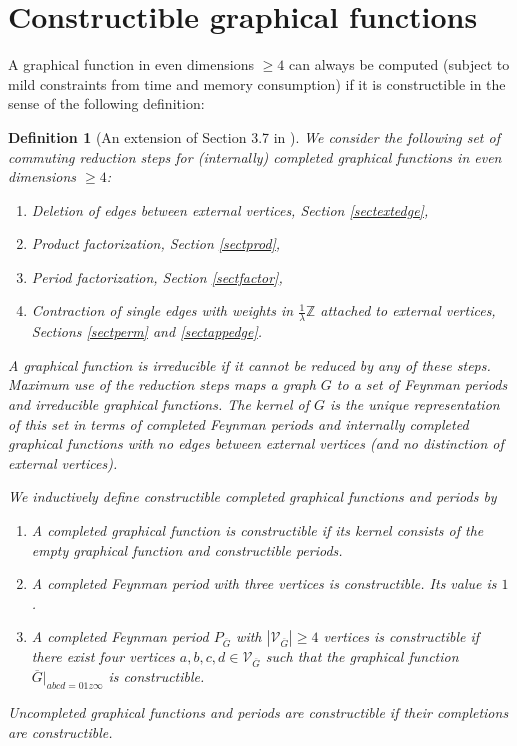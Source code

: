 \documentclass[oneside]{amsart}
\newcommand{\ZZ}{{\mathbb Z}}
\newcommand{\Gg}{{\overline{G}}}
\newcommand{\sV}{\mathcal{V}}
\theoremstyle{plain}
\newtheorem{defn}[thm]{Definition}
\begin{document}
\section{Constructible graphical functions}\label{sectconstructible}
A graphical function in even dimensions $\geq4$ can always be computed (subject to mild constraints from time and memory consumption) if it is constructible in the sense of the following definition:

\begin{defn}[An extension of Section 3.7 in \cite{gf}]\label{defconstructible}
We consider the following set of commuting reduction steps for (internally) completed graphical functions in even dimensions $\geq4$:
\begin{enumerate}
\item[(R1)] Deletion of edges between external vertices, Section \ref{sectextedge},
\item[(R2)] Product factorization, Section \ref{sectprod},
\item[(R3)] Period factorization, Section \ref{sectfactor},
\item[(R4)] Contraction of single edges with weights in $\frac{1}{\lambda}\ZZ$ attached to external vertices, Sections \ref{sectperm} and \ref{sectappedge}.
\end{enumerate}
A graphical function is {\em irreducible} if it cannot be reduced by any of these steps.
Maximum use of the reduction steps maps a graph $G$ to a set of Feynman periods and irreducible graphical functions.
The {\em kernel} of $G$ is the unique \cite{Census} representation of this set in terms of completed Feynman periods and internally completed graphical functions with no edges between
external vertices (and no distinction of external vertices).

We inductively define constructible completed graphical functions and periods by
\begin{enumerate}
\item A completed graphical function is constructible if its kernel consists of the empty graphical function and constructible periods.
\item A completed Feynman period with three vertices is constructible. Its value is $1$.
\item A completed Feynman period $P_\Gg$ with $|\sV_\Gg|\geq4$ vertices is constructible if there exist four vertices $a,b,c,d\in\sV_\Gg$
such that the graphical function $\Gg|_{abcd=01z\infty}$ is constructible.
\end{enumerate}
Uncompleted graphical functions and periods are constructible if their completions are constructible.
\end{defn}
\end{document}
